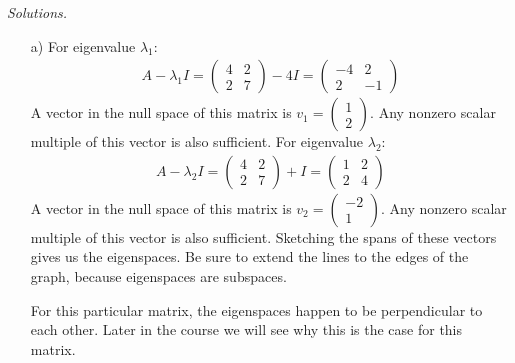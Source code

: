     \ifnum {} {\color{DarkBlue} \textit{Solutions.} 
    \begin{enumerate}
        \item[a)] For eigenvalue $\lambda_1$: 
        \begin{align}
            A - \lambda_1 I = \begin{pmatrix} 4&2\\2&7 \end{pmatrix} - 4I = \begin{pmatrix} -4&2\\2&-1 \end{pmatrix}
        \end{align}
        A vector in the null space of this matrix is $v_1 = \begin{pmatrix} 1\\2\end{pmatrix}$. Any nonzero scalar multiple of this vector is also sufficient. For eigenvalue $\lambda_2$: 
        \begin{align}
            A - \lambda_2 I = \begin{pmatrix} 4&2\\2&7 \end{pmatrix}  + I = \begin{pmatrix} 1&2\\2&4 \end{pmatrix}
        \end{align}
        A vector in the null space of this matrix is $v_2 = \begin{pmatrix} -2\\1\end{pmatrix}$. Any nonzero scalar multiple of this vector is also sufficient. Sketching the spans of these vectors gives us the eigenspaces. Be sure to extend the lines to the edges of the graph, because eigenspaces are subspaces. 

        \begin{center}
        \end{center}
        For this particular matrix, the eigenspaces happen to be perpendicular to each other. Later in the course we will see why this is the case for this matrix. 


\end{enumerate}}

